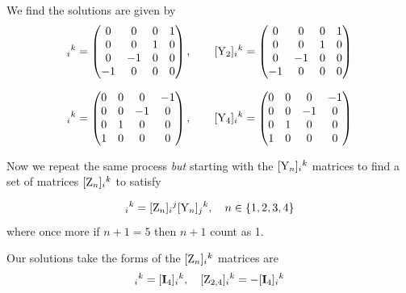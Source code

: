 \documentclass[12pt]{article}
\let\bm\relax
\newcommand{\bm}[1]{{\boldsymbol{#1}}}
\begin{document}
We find the solutions are given by
\begin{equation}
[{\bm{\rm Y}}_1]_{i}{}^{k}=
\begin{pmatrix}
0 & 0 & 0 & 1 \\
0 & 0 & 1 & 0 \\
0 & -1 & 0 & 0 \\
-1 & 0 & 0 & 0 \\
\end{pmatrix}
,\quad\quad
[{\bm{\rm Y}}_2]_{i}{}^{k}=
\begin{pmatrix}
0 & 0 & 0 & 1 \\
0 & 0 & 1 & 0 \\
0 & -1 & 0 & 0 \\
-1 & 0 & 0 & 0 \\
\end{pmatrix}
\end{equation}

\begin{equation}
[{\bm{\rm Y}}_3]_{i}{}^{k}=
\begin{pmatrix}
0 & 0 & 0 & -1 \\
0 & 0 & -1 & 0 \\
0 & 1 & 0 & 0 \\
1 & 0 & 0 & 0 \\
\end{pmatrix}
,\quad\quad
[{\bm{\rm Y}}_4]_{i}{}^{k}=
\begin{pmatrix}
0 & 0 & 0 & -1 \\
0 & 0 & -1 & 0 \\
0 & 1 & 0 & 0 \\
1 & 0 & 0 & 0 \\
\end{pmatrix}
\end{equation}

Now we repeat the same process {\it {but}} starting with the
$[{\bm{\rm Y}}_n]_{i}{}^{k}$ matrices to find a set of matrices
$[{\bm{\rm Z}}_n]_{i}{}^{k}$ to satisfy

\begin{equation}
[{\bm{\rm Y}}_{n+1}]_{i}{}^{k}=[{\bm{\rm Z}}_n]_{i}{}^{j}[{\bm{\rm Y}}_n]_{j}{}^{k},\quad n\in\{1,2,3,4\}
\label{eq3.9}
\end{equation}
where once more if $n+1=5$ then $n+1$ count as 1.

Our solutions take the forms of the $[{\bm{\rm Z}}_n]_{i}{}^{k}$ matrices are
\begin{equation}
[{\bm{\rm Z}}_{1,3}]_{i}{}^{k}=[\mathbf{I}_{4}]_{i}{}^{k},\quad [{\bm{\rm Z}}_{2,4}]_{i}{}^{k}=-
[\mathbf{I}_{4}]_{i}{}^{k} 
\end{equation}
\end{document}
